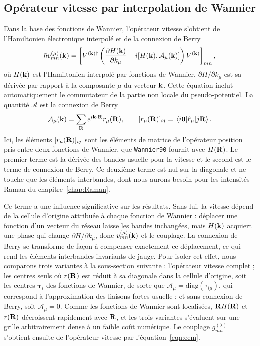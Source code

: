 \subsection{Opérateur vitesse par interpolation de Wannier}

Dans la base des fonctions de Wannier, l'opérateur vitesse s'obtient de l'Hamiltonien électronique interpolé et de la connexion de Berry~\cite{yatesSpectralFermiSurface2007}
\begin{equation}
    \hbar v_{mn}^{(\mu)}(\mathbf{k}) = \left[V^{(\mathbf{k})\dag}\left(\frac{\partial H(\mathbf{k})}{\partial k_\mu}+i[H(\mathbf{k}),\mathcal{A}_\mu(\mathbf{k})]\right)V^{(\mathbf{k})}\right]_{mn},\label{eqn:op_vitesse}
\end{equation}
où $H(\mathbf{k})$ est l'Hamiltonien interpolé par fonctions de Wannier, $\partial H/\partial k_\mu$ est sa dérivée par rapport à la composante $\mu$ du vecteur $\mathbf{k}$. Cette équation inclut automatiquement le commutateur de la partie non locale du pseudo-potentiel. La quantité $\bm{\mathcal{A}}$ est la connexion de Berry
\begin{equation}
    \mathcal{A}_\mu(\kv) = \sum_\Rv e^{i\kv\cdot\Rv}r_\mu(\Rv),\qquad [r_\mu(\Rv)]_{ij}=\matrixel{i\bm 0}{\hat{r}_\mu}{j\Rv}.
\end{equation}
Ici, les éléments $[r_\mu(\mathbf{R})]_{ij}$ sont les éléments de matrice de l'opérateur position pris entre deux fonctions de Wannier, que \texttt{Wannier90} fournit avec $H(\mathbf{R})$. Le premier terme est la dérivée des bandes usuelle pour la vitesse et le second est le terme de connexion de Berry. Ce deuxième terme est nul sur la diagonale et ne touche que les éléments interbandes, dont nous aurons besoin pour les intensités Raman du chapitre~\ref{chap:Raman}.

Ce terme a une influence significative sur les résultats. Sans lui, la vitesse dépend de la cellule d'origine attribuée à chaque fonction de Wannier : déplacer une fonction d'un vecteur du réseau laisse les bandes inchangées, mais $H(\mathbf{k})$ acquiert une phase qui change $\partial H/\partial k_\mu$, donc $v^{(\mu)}_{mn}(\mathbf{k})$ et le couplage. La connexion de Berry se transforme de façon à compenser exactement ce déplacement, ce qui rend les éléments interbandes invariants de jauge. Pour isoler cet effet, nous comparons trois variantes à la sous-section suivante : l'opérateur vitesse complet ; les \og centres seuls \fg{} où $r(\mathbf{R})$ est réduit à sa diagonale dans la cellule d'origine, soit les centres $\bm\tau _i$ des fonctions de Wannier, de sorte que $\mathcal{A}_\mu =\mathrm{diag}(\tau_{i\mu})$, qui correspond à l'approximation des liaisons fortes usuelle ; et sans connexion de Berry, soit $\mathcal{A}_\mu=0$. Comme les fonctions de Wannier sont localisées, $\mathbf{R} H(\mathbf{R})$ et $r(\mathbf{R})$ décroissent rapidement avec $\mathbf{R}$, et les trois variantes s'évaluent sur une grille arbitrairement dense à un faible coût numérique. Le couplage $g_{mn}^{(\lambda)}$ s'obtient ensuite de l'opérateur vitesse par l'équation~\eqref{eqn:eem}.

